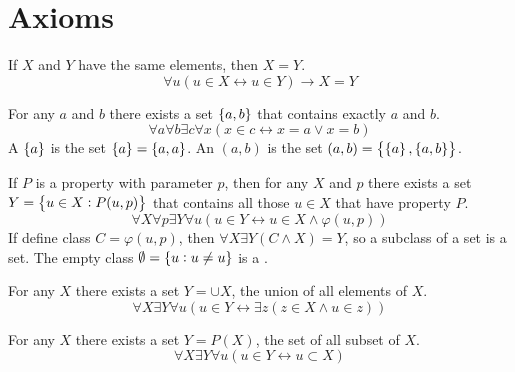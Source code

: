 \section{Axioms}

\begin{axiom}\label{axiomofextensionality}
    If $X$ and $Y$ have the same elements, then $X=Y$.
    \begin{equation}
        \forall u (u \in X \leftrightarrow u \in Y ) \rightarrow X = Y
    \end{equation}
\end{axiom}

\begin{axiom}
    For any $a$ and $b$ there exists a set $\set{a,b}$ that contains exactly $a$ and $b$.
    \begin{equation}
        \forall a \forall b \exists c \forall x (x \in c \leftrightarrow x = a \vee x = b )
    \end{equation}
    A  $\set{a}$ is the set $\set{a} = \set{a, a}$. An  $(a,b)$ is the set $(a,b) = \set{\set{a}, \set{a,b}}$.
\end{axiom}

\begin{axiom}
    If $P$ is a property with parameter $p$, then for any $X$ and $p$ there exists a set $Y = \set{u \in X: P(u,p)}$ that contains all those $u \in X$ that have property $P$.
    \begin{equation}
        \forall X \forall p \exists Y \forall u \left(u \in Y \leftrightarrow u \in X \wedge \varphi(u, p) \right)
    \end{equation}
    If define class $C = \varphi(u, p)$, then $\forall X \exists Y (C \wedge X )= Y$, so a subclass of a set is a set. The empty class $\emptyset = \set{u: u \neq u} $ is a .
\end{axiom}

\begin{axiom}
    For any $X$ there exists a set $Y = \cup X$, the union of all elements of $X$.
    \begin{equation}
        \forall X \exists Y \forall u \left(u \in Y \leftrightarrow \exists z (z \in X \wedge u \in z ) \right)
    \end{equation}
\end{axiom}

\begin{axiom}
    For any $X$ there exists a set $Y = P(X)$, the set of all subset of $X$.
    \begin{equation}
        \forall X \exists Y \forall u (u \in Y \leftrightarrow u \subset X )
    \end{equation}
\end{axiom}

